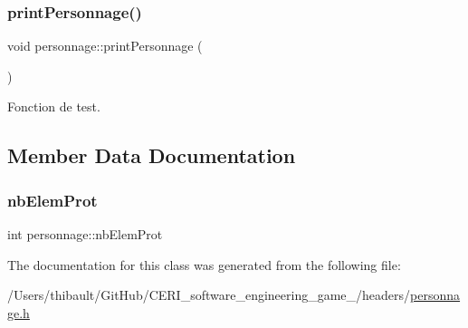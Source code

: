 \subsubsection{\texorpdfstring{print\+Personnage()}{printPersonnage()}}
{\footnotesize\ttfamily void personnage\+::print\+Personnage (\begin{DoxyParamCaption}{ }\end{DoxyParamCaption})}



Fonction de test. 



\subsection{Member Data Documentation}
\mbox{\label{classpersonnage_ac16eee4c03f417dfce6b7c18f3ee682d}} 
\subsubsection{\texorpdfstring{nb\+Elem\+Prot}{nbElemProt}}
{\footnotesize\ttfamily int personnage\+::nb\+Elem\+Prot\hspace{0.3cm}{\ttfamily [static]}}



The documentation for this class was generated from the following file\+:\begin{DoxyCompactItemize}
\item 
/\+Users/thibault/\+Git\+Hub/\+C\+E\+R\+I\+\_\+software\+\_\+engineering\+\_\+game\+\_/headers/\hyperlink{personnage_8h}{personnage.\+h}\end{DoxyCompactItemize}

